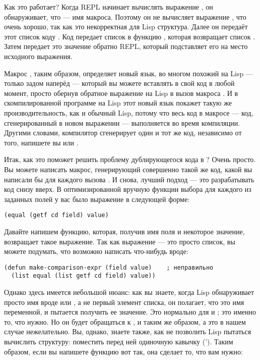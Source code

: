 Как это работает? Когда REPL начинает вычислять выражение , он
обнаруживает, что  --- имя макроса. Поэтому он не вычисляет выражение
, что очень хорошо, так как это некорректная для Lisp
структура. Далее он передаёт этот список коду . Код 
передает список в функцию , которая возвращает список . Затем  передает это значение обратно REPL, который
подставляет его на место исходного выражения.

Макрос , таким образом, определяет новый язык, во многом похожий на Lisp
--- только задом наперёд --- который вы можете вставлять в свой код в любой момент, просто
обернув обратное выражение на Lisp в вызов макроса . И в скомпилированной
программе на Lisp этот новый язык покажет такую же производительность, как и обычный Lisp,
потому что весь код в макросе --- код, сгенерированный в новом выражении --- выполняется
во время компиляции. Другими словами, компилятор сгенерирует один и тот же код, независимо
от того, напишете вы  или .

Итак, как это поможет решить проблему дублирующегося кода в ? Очень просто. Вы
можете написать макрос, генерирующий совершенно такой же код, какой вы написали бы для
каждого вызова . И снова, лучший подход --- это разрабатывать код снизу
вверх. В оптимизированной вручную функции выбора  для каждого из заданных
полей у вас было выражение в следующей форме:

\begin{lstlisting}
(equal (getf cd field) value)
\end{lstlisting}

Давайте напишем функцию, которая, получив имя поля и некоторое значение, возвращает такое
выражение. Так как выражение --- это просто список, вы можете подумать, что возможно
написать что-нибудь вроде:

\begin{lstlisting}
(defun make-comparison-expr (field value)    ; неправильно
  (list equal (list getf cd field) value))
\end{lstlisting}

Однако здесь имеется небольшой нюанс: как вы знаете, когда Lisp обнаруживает просто имя
вроде  или , а не первый элемент списка, он полагает, что это имя
переменной, и пытается получить ее значение. Это нормально для  и
; это именно то, что нужно. Но он будет обращаться к , 
и  таким же образом, а это в нашем случае нежелательно. Вы, однако, знаете также,
как не позволить Lisp пытаться вычислить структуру: поместить перед ней одиночную кавычку
(\code{}'). Таким образом, если вы напишете функцию  вот так,
она сделает то, что вам нужно:

